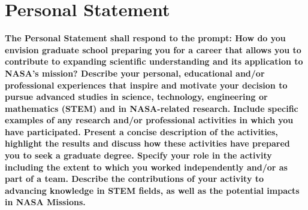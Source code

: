 \documentclass[12pt]{article}
\begin{document}
\section{Personal Statement}
\textbf{The Personal Statement shall respond to the
prompt: How do you envision graduate school preparing you for a career that allows you
to contribute to expanding scientific understanding and its application to NASA’s
mission?
Describe your personal, educational and/or professional experiences that inspire and
motivate your decision to pursue advanced studies in science, technology, engineering
or mathematics (STEM) and in NASA-related research. Include specific examples of any
research and/or professional activities in which you have participated. Present a concise
description of the activities, highlight the results and discuss how these activities have
prepared you to seek a graduate degree. Specify your role in the activity including the
extent to which you worked independently and/or as part of a team. Describe the
contributions of your activity to advancing knowledge in STEM fields, as well as the
potential impacts in NASA Missions.}
\end{document}
